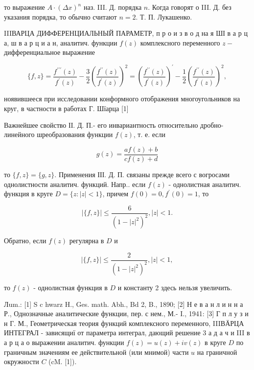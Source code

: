 \documentclass[10pt]{article}
\begin{document}
то выражение $A \cdot(\Delta x)^{n}$ наз. III. Д. порядка $n$. Когда говорят о III. Д. без указания порядка, то обычно считают $n=2$. Т. П. Лукашенко.



IIIВАРЦА ДИФФЕРЕНЦИАЛЬНЫЙ ПАРАМЕТР, п р о и з в о д на я ШІ в а р ц а, ш в а р ц и а н, аналитич. функции $f(z)$ комплексного переменного $z-$ дифференциальное выражение



\[

\{f, z\}=\frac{f^{\prime \prime \prime}(z)}{f^{\prime}(z)}-\frac{3}{2}\left(\frac{f^{\prime \prime}(z)}{f^{\prime}(z)}\right)^{2}=\left(\frac{f^{\prime \prime}(z)}{f^{\prime}(z)}\right)^{\prime}-\frac{1}{2}\left(\frac{f^{\prime \prime}(z)}{f^{\prime}(z)}\right)^{2},

\]



ноявившееся при исследовании конформного отображения многоугольников на круг, в частности в работах Г. Шїарца [1]



Важнейшее свойство ІІ. Д. П.- его инвариантность относительно дробно-линейного шреобразования функции $f(z)$, т. е. если



\[

g(z)=\frac{a f(z)+b}{c f(z)+d}

\]



то $\{f, z\}=\{g, z\}$. Применения ІІІ. Д. П. связаны прежде всего с вогросами однолистности аналитич. функций. Напр.. если $f(z)$ - однолистная аналитич. функция в круге $D=\{z:|z|<1\}$, причем $f(0)=0, f^{\prime}(0)=1$, то



\[

|\{f, z\}| \leqslant \frac{6}{\left(1-|z|^{2}\right)^{2}},|z|<1 .

\]



Обратно, если $f(z)$ регулярна в $D$ и



\[

|\{f, z\}| \leqslant \frac{2}{\left(1-|z|^{2}\right)^{2}},|z|<1,

\]



то $f(z)$ - однолистная функция в $D$ и константу 2 здесь нельзя увеличить.



Лum.: [1] S c hwarz H., Ges. math. Abh., Bd 2, B., 1890; [2] Н е в а н л и н н а Р., Однозначные аналитические функции, пер. с нем., М.- I., 1941: [3] Г п л у з и н Г. М., Геометрическая теория функций комплексного переменного, IIIВӒРЦА ИНТЕГРАЛ - зависящиї от параметра интеграл, дающий решение 3 а д а ч и III в а р ц а о выражении аналитич. функции $f(z)=u(z)+i v(z)$ в круге $D$ по граничным значениям ее действительной (или мнимой) части $u$ на граничной окружности $C$ (cM. [1]).
\end{document}
